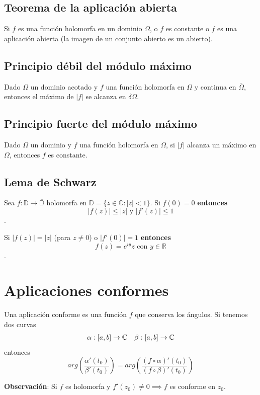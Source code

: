 \documentclass[paper=a4, fontsize=11pt]{scrartcl}
\numberwithin{equation}{section}
\numberwithin{figure}{section}
\numberwithin{table}{section}
\begin{document}
\subsection{Teorema de la aplicación abierta}
Si $f$ es una función holomorfa en un dominio $\Omega$, o $f$ es constante o $f$ es una aplicación abierta (la imagen de un conjunto abierto es un abierto).

\subsection{Principio débil del módulo máximo}
Dado $\Omega$ un dominio acotado y $f$ una función holomorfa en $\Omega$ y continua en $\overline{\Omega}$, entonces el máximo de $|f|$ se alcanza en $\delta\Omega$.

\subsection{Principio fuerte del módulo máximo}
Dado $\Omega$ un dominio y $f$ una función holomorfa en $\Omega$, si $|f|$ alcanza un máximo en $\Omega$, entonces $f$ es constante.

\subsection{Lema de Schwarz}
Sea $f:\mathbb{D}\to\overline{\mathbb{D}}$ holomorfa en $\mathbb{D}=\{z\in\mathbb{C}: |z|<1\}$. Si $\boxed{f(0) = 0}$ \textbf{entonces} $$\boxed{|f(z)|\le|z|}\text{ y }\boxed{|f'(z)| \le 1}$$.

Si $\boxed{|f(z)|=|z|}$ (para $z\neq 0$) o $\boxed{|f'(0)| = 1}$ \textbf{entonces} $$\boxed{f(z) = e^{iy}z}\text{ con }y\in\mathbb{R}$$.

\newpage
\section{Aplicaciones conformes}
Una aplicación conforme es una función $f$ que conserva los ángulos. Si tenemos dos curvas
$$
\begin{array}{l l}
\alpha:[a,b]\to\mathbb{C} & \beta:[a,b]\to\mathbb{C}
\end{array}
$$
entonces
$$arg\left(\frac{\alpha'(t_0)}{\beta'(t_0)}\right) = arg\left(\frac{\left(f\circ \alpha \right)'(t_0)}{\left(f\circ \beta \right)'(t_0)}\right)$$

\textbf{Observación}: Si $f$ es holomorfa y $f'(z_0)\neq 0 \implies f$ es conforme en $z_0$.
\end{document}
